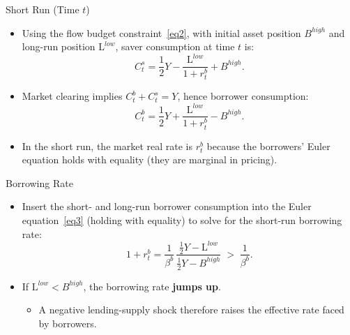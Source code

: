 \documentclass[11pt,aspectratio=169]{beamer}
\begin{document}
\begin{frame}{Short Run (Time $t$)}
\small
\begin{itemize}
  \item Using the flow budget constraint~\eqref{eq2}, with initial asset position $B^{high}$ and long-run position $\mathrm{L}^{low}$, saver consumption at time $t$ is:
  \[
    C_t^s=\frac{1}{2}Y-\frac{\mathrm{L}^{low}}{1+r_t^b}+B^{high}.
  \]
  \vspace{0.25em}
  \item Market clearing implies $C_t^b+C_t^s=Y$, hence borrower consumption:
  \[
    C_t^b=\frac{1}{2}Y+\frac{\mathrm{L}^{low}}{1+r_t^b}-B^{high}.
  \]
  \vspace{0.25em}
  \item In the short run, the market real rate is $r_t^b$ because the borrowers' Euler equation holds with equality (they are marginal in pricing).
\end{itemize}
\end{frame}

\begin{frame}{Borrowing Rate}
\small
\begin{itemize}
  \item Insert the short- and long-run borrower consumption into the Euler equation~\eqref{eq3} (holding with equality) to solve for the short-run borrowing rate:
  \[
    1+r_t^b=\frac{1}{\beta^b}\,
    \frac{\frac{1}{2}Y-\mathrm{L}^{low}}{\frac{1}{2}Y-B^{high}}
    \;>\;\frac{1}{\beta^b}.
  \]
  \vspace{0.3em}
  \item If $\mathrm{L}^{low}<B^{high}$, the borrowing rate \textbf{jumps up}.
  \begin{itemize}
    \item A negative lending-supply shock therefore raises the effective rate faced by borrowers.
  \end{itemize}
\end{itemize}
\end{frame}
\end{document}
